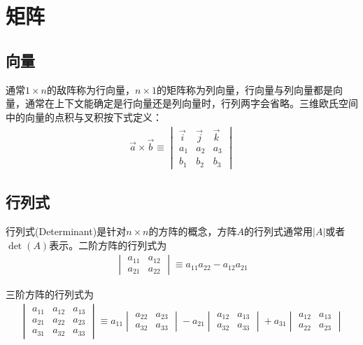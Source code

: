 
\chapter{矩阵}
\label{chap:matrix}

\section{向量}
\label{sec:vector}

通常$1\times n$的敌阵称为行向量，$n\times 1$的矩阵称为列向量，行向量与列向量都是向量，通常在上下文能确定是行向量还是列向量时，行列两字会省略。三维欧氏空间中的向量的点积与叉积按下式定义：
\begin{align*}
  \vec{a}\times\vec{b}\equiv
  \begin{vmatrix}
    \vec i & \vec j & \vec k\\
    a_1    & a_2    & a_3\\
    b_1    & b_2    & b_3
  \end{vmatrix}
\end{align*}


\section{行列式}
\label{sec:determinant}

行列式(Determinant)是针对$n\times n$的方阵的概念，方阵$A$的行列式通常用$\left| A\right|$或者$\det(A)$表示。二阶方阵的行列式为
\begin{align*}
  \begin{vmatrix}
    a_{11} & a_{12}\\
    a_{21} & a_{22}
  \end{vmatrix}
             \equiv a_{11}a_{22} - a_{12}a_{21}
\end{align*}

三阶方阵的行列式为
\begin{align*}
  \begin{vmatrix}
    a_{11} & a_{12} & a_{13}\\
    a_{21} & a_{22} & a_{23}\\
    a_{31} & a_{32} & a_{33}
  \end{vmatrix}\equiv
   a_{11}\begin{vmatrix} a_{22} & a_{23}\\ a_{32} & a_{33} \end{vmatrix}
  -a_{21}\begin{vmatrix} a_{12} & a_{13}\\ a_{32} & a_{33} \end{vmatrix}
  +a_{31}\begin{vmatrix} a_{12} & a_{13}\\ a_{22} & a_{23} \end{vmatrix}
\end{align*}

